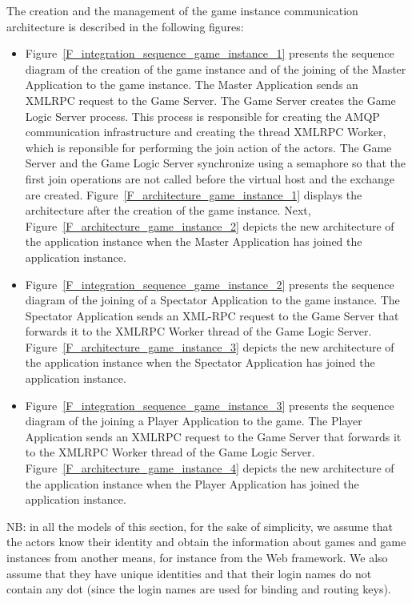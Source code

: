 The creation and the management of the game instance communication
architecture is described in the following figures:
\begin{itemize}
\item Figure~\ref{F_integration_sequence_game_instance_1} presents the
  sequence diagram of the creation of the game instance and of the
  joining of the \textsf{Master Application} to the game
  instance. The \textsf{Master Application} sends an XMLRPC request to
  the \textsf{Game Server}. The \textsf{Game Server} creates the
  \textsf{Game Logic Server} process. This process is responsible for
  creating the AMQP communication infrastructure and creating the
  thread \textsf{XMLRPC Worker}, which is reponsible for performing
  the join action of the actors. The \textsf{Game Server} and the
  \textsf{Game Logic Server} synchronize using a semaphore so that the
  first join operations are not called before the virtual host and the
  exchange are created.  Figure~\ref{F_architecture_game_instance_1}
  displays the architecture after the creation of the game instance.
  Next, Figure~\ref{F_architecture_game_instance_2} depicts the new
  architecture of the application instance when the \textsf{Master
    Application} has joined the application instance.
\item Figure~\ref{F_integration_sequence_game_instance_2} presents the
  sequence diagram of the joining of a \textsf{Spectator Application}
  to the game instance. The \textsf{Spectator Application} sends an
  XML-RPC request to the \textsf{Game Server} that forwards it to the
  \textsf{XMLRPC Worker} thread of the \textsf{Game Logic
    Server}. Figure~\ref{F_architecture_game_instance_3} depicts the
  new architecture of the application instance when the
  \textsf{Spectator Application} has joined the application instance.
\item Figure~\ref{F_integration_sequence_game_instance_3} presents the
  sequence diagram of the joining a \textsf{Player Application} to the
  game. The \textsf{Player Application} sends an XMLRPC request to the
  \textsf{Game Server} that forwards it to the \textsf{XMLRPC Worker}
  thread of the \textsf{Game Logic
    Server}. Figure~\ref{F_architecture_game_instance_4} depicts the
  new architecture of the application instance when the
  \textsf{Player Application} has joined the application
  instance.
\end{itemize}

NB: in all the models of this section, for the sake of simplicity, we
assume that the actors know their identity and obtain the information
about games and game instances from another means, for instance from
the Web framework. We also assume that they have unique identities
and that their login names do not contain any dot (since the login
names are used for binding and routing keys).

